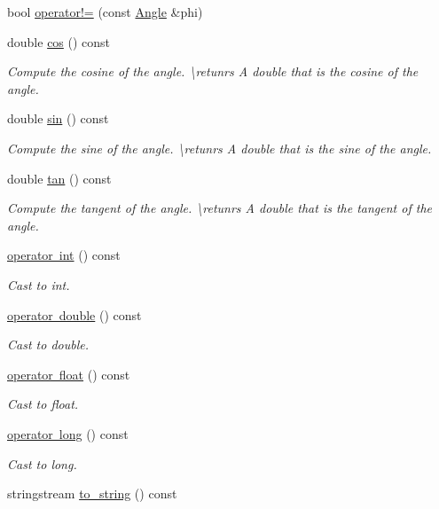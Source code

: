 \begin{DoxyCompactItemize}
\item 
bool \mbox{\hyperlink{class_angle_a8d22835be41b628a5216243b7f7e50a1}{operator!=}} (const \mbox{\hyperlink{class_angle}{Angle}} \&phi)
\item 
double \mbox{\hyperlink{class_angle_aedc259112dacf9197d787645f7e48911}{cos}} () const
\begin{DoxyCompactList}\small\item\em Compute the cosine of the angle. \textbackslash{}retunrs A {\ttfamily double} that is the cosine of the angle. \end{DoxyCompactList}\item 
double \mbox{\hyperlink{class_angle_a8ef2eabcb790d0b1fee0c2b4abaa50ba}{sin}} () const
\begin{DoxyCompactList}\small\item\em Compute the sine of the angle. \textbackslash{}retunrs A {\ttfamily double} that is the sine of the angle. \end{DoxyCompactList}\item 
double \mbox{\hyperlink{class_angle_a2b1f249db1c3a2b741c2834b2d04d60a}{tan}} () const
\begin{DoxyCompactList}\small\item\em Compute the tangent of the angle. \textbackslash{}retunrs A {\ttfamily double} that is the tangent of the angle. \end{DoxyCompactList}\item 
\mbox{\hyperlink{class_angle_ab4837cee1b926cd3f8f08c91d2d08c70}{operator int}} () const
\begin{DoxyCompactList}\small\item\em Cast to int. \end{DoxyCompactList}\item 
\mbox{\hyperlink{class_angle_a01eeceefbe7fc7172f7e4fbe17464e01}{operator double}} () const
\begin{DoxyCompactList}\small\item\em Cast to double. \end{DoxyCompactList}\item 
\mbox{\hyperlink{class_angle_a88d0ffaac106cff8233821b2f970b137}{operator float}} () const
\begin{DoxyCompactList}\small\item\em Cast to float. \end{DoxyCompactList}\item 
\mbox{\hyperlink{class_angle_a497355a5d68f92e7801ee4072e234185}{operator long}} () const
\begin{DoxyCompactList}\small\item\em Cast to long. \end{DoxyCompactList}\item 
stringstream \mbox{\hyperlink{class_angle_a30cf6acb380ac16fbf308032a109dcd4}{to\+\_\+string}} () const
\end{DoxyCompactItemize}
